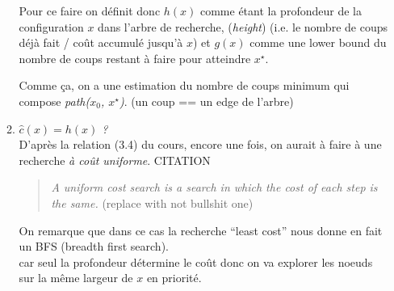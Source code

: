 \documentclass[french]{article}
\newcommand{\quo}[1]{``{#1}''}
\newcommand{\xsol}{x^{\star}}
\begin{document}
\begin{enumerate}[label=(\alph*)]
\begin{enumerate}[label=\arabic*)]
	Pour ce faire on définit donc $h(x)$ comme étant la profondeur de la configuration $x$ dans l'arbre de recherche, (\textit{height})
	(i.e. le nombre de coups déjà fait / coût accumulé jusqu'à $x$) et $g(x)$ comme une lower bound du nombre de coups restant à faire pour atteindre $\xsol$.
	
	Comme ça, on a une estimation du nombre de coups minimum qui compose \textit{path($x_0$, $\xsol$)}. (un coup == un edge de l'arbre)\\
	
	\item \textit{$\hat{c}(x) = h(x)$ ?}\\
	D'après la relation (3.4) du cours, encore une fois, on aurait à faire à une recherche \textit{à coût uniforme}.
	CITATION
	\begin{quote}
		\textit{A uniform cost search is a search in which the cost of each step is the same.}
		(replace with not bullshit one)
	\end{quote}
	On remarque que dans ce cas la recherche \quo{least cost} nous donne en fait un BFS (breadth first search).\\
	car seul la profondeur détermine le coût donc on va explorer les noeuds sur la même largeur de $x$ en priorité.\\
	
\end{enumerate}


%
%
\end{enumerate}

%
%
\end{document}
